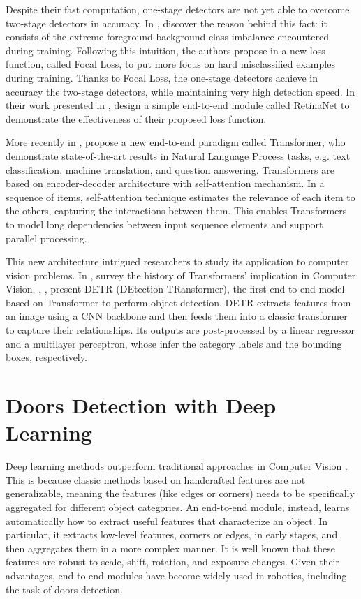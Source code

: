  Despite their fast computation, one-stage detectors are not yet able to overcome two-stage detectors in accuracy. In \cite{focalloss}, \citeauthor{focalloss} discover the reason behind this fact: it consists of the extreme foreground-background class imbalance encountered during training. Following this intuition, the authors propose in \cite{focalloss} a new loss function, called Focal Loss, to put more focus on hard misclassified examples during training. Thanks to Focal Loss, the one-stage detectors achieve in accuracy the two-stage detectors, while maintaining very high detection speed. In their work presented in \cite{focalloss}, \citeauthor{focalloss} design a simple end-to-end module called RetinaNet to demonstrate the effectiveness of their proposed loss function. 
 
 More recently in \cite{transformer}, \citeauthor{transformer} propose a new end-to-end paradigm called Transformer, who demonstrate state-of-the-art results in Natural Language Process tasks, e.g. text classification, machine translation, and question answering. Transformers are based on encoder-decoder architecture with self-attention mechanism. In a sequence of items, self-attention technique estimates the relevance of each item to the others, capturing the interactions between them. This enables Transformers to model long dependencies between input sequence elements and support parallel processing. 
 
 This new architecture intrigued researchers to study its application to computer vision problems. In \cite{surveytransformer}, \citeauthor{surveytransformer} survey the history of Transformers' implication in Computer Vision. \citeauthor{detr}, \cite{detr}, present DETR (DEtection TRansformer), the first end-to-end model based on Transformer to perform object detection. DETR extracts features from an image using a CNN backbone and then feeds them into a classic transformer to capture their relationships. Its outputs are post-processed by a linear regressor and a multilayer perceptron, whose infer the category labels and the bounding boxes, respectively.
 
 \section{Doors Detection with Deep Learning} 
 Deep learning methods outperform traditional approaches in Computer Vision \cite{deeplearningoverview}. This is because classic methods based on handcrafted features are not generalizable, meaning the features (like edges or corners) needs to be specifically aggregated for different object categories. An end-to-end module, instead, learns automatically how to extract useful features that characterize an object. In particular, it extracts low-level features, corners or edges, in early stages, and then aggregates them in a more complex manner. It is well known that these features are robust to scale, shift, rotation, and exposure changes. Given their advantages, end-to-end modules have become widely used in robotics, including the task of doors detection.
 
